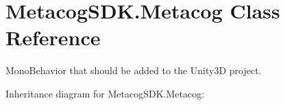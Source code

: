 \hypertarget{classMetacogSDK_1_1Metacog}{}\section{Metacog\+S\+D\+K.\+Metacog Class Reference}
\label{classMetacogSDK_1_1Metacog}


Mono\+Behavior that should be added to the Unity3D project.  




Inheritance diagram for Metacog\+S\+D\+K.\+Metacog\+:
